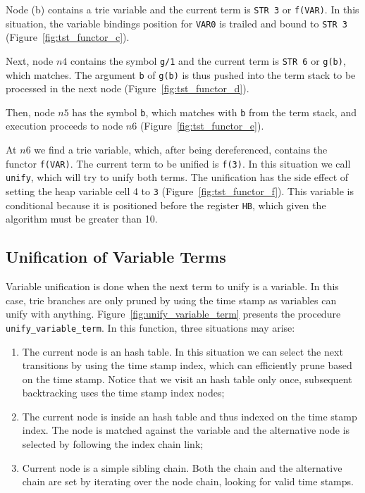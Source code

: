 Node (b) contains a trie variable and the current term is \texttt{STR 3} or \texttt{f(VAR)}.
In this situation, the variable bindings position for \texttt{VAR0} is trailed and bound to \texttt{STR 3}
(Figure~\ref{fig:tst_functor_c}).

Next, node $n4$ contains the symbol \texttt{g/1} and the current term is \texttt{STR 6}
or \texttt{g(b)}, which matches. The argument \texttt{b} of \texttt{g(b)}
is thus pushed into the term stack to be processed in the next node (Figure~\ref{fig:tst_functor_d}).

Then, node $n5$ has the symbol \texttt{b}, which matches with \texttt{b} from the term stack, and
execution proceeds to node $n6$ (Figure~\ref{fig:tst_functor_e}).

At $n6$ we find a trie variable, which, after being dereferenced, contains the
functor \texttt{f(VAR)}. The current term to be unified is \texttt{f(3)}.
In this situation we call \texttt{unify}, which will try to unify both terms.
The unification has the side effect of setting the heap variable cell 4 to \texttt{3}
(Figure~\ref{fig:tst_functor_f}).
This variable is conditional because it is positioned before the register \texttt{HB},
which given the algorithm must be greater than 10.

\subsection{Unification of Variable Terms}

Variable unification is done when the next term to unify is a variable. In this case, trie branches are only pruned
by using the time stamp as variables can unify with anything.
Figure~\ref{fig:unify_variable_term} presents the procedure \texttt{unify\_variable\_term}. In this function, three
situations may arise:

\begin{enumerate}
  \item The current node is an hash table. In this situation we can select the next transitions
   by using the time stamp index, which can efficiently prune based on the time stamp. Notice that we visit
   an hash table only once, subsequent backtracking uses the time stamp index nodes;
  \item The current node is inside an hash table and thus indexed on the time stamp index.
   The node is matched against the variable and the alternative node is selected by following
   the index chain link;
  \item Current node is a simple sibling chain. Both the chain and the alternative chain are set by
   iterating over the node chain, looking for valid time stamps.
\end{enumerate}

